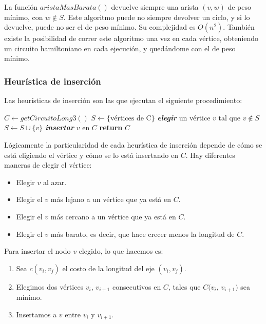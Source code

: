 La funci\'on $aristaMasBarata()$ devuelve siempre una arista $(v,w)$ de peso m\'inimo, con $w \not\in S$. Este algoritmo puede no siempre devolver un ciclo, y si lo devuelve, puede no ser el de peso m\'inimo. Su complejidad es $O(n^2)$. Tambi\'en existe la posibilidad de correr este algoritmo una vez en cada v\'ertice, obteniendo un circuito hamiltoniano en cada ejecuci\'on, y qued\'andome con el de peso m\'inimo.

\newpage
\subsubsection*{Heur\'istica de inserci\'on}

Las heur\'isticas de inserci\'on son las que ejecutan el siguiente procedimiento:

\begin{algorithm}
\begin{algorithmic}[1]
\State $C \gets getCircuitoLong3()$
\State $S \gets \{ \textrm{v\'ertices de C} \}$
  \State \textbf{\emph{elegir}} un v\'ertice $v$ tal que $v \not\in S$
  \State $S \gets S \cup \{ v \}$
  \State \textbf{\emph{insertar}} $v$ en $C$
\EndWhile
\State \textbf{return} $C$
\end{algorithmic}
\end{algorithm}

L\'ogicamente la particularidad de cada heur\'istica de inserci\'on depende de c\'omo se est\'a eligiendo el v\'ertice y c\'omo se lo est\'a insertando en $C$. Hay diferentes maneras de elegir el v\'ertice:

\begin{itemize}
\item Elegir $v$ al azar.
\item Elegir el $v$ m\'as lejano a un v\'ertice que ya est\'a en $C$.
\item Elegir el $v$ m\'as cercano a un v\'ertice que ya est\'a en $C$.
\item Elegir el $v$ m\'as barato, es decir, que hace crecer menos la longitud de $C$.
\end{itemize}

Para insertar el nodo $v$ elegido, lo que hacemos es:

\begin{enumerate}
\item Sea $c(v_i,v_j)$ el costo de la longitud del eje $(v_i,v_j)$.
\item Elegimos dos v\'ertices $v_i$, $v_{i+1}$ consecutivos en $C$, tales que $C(v_i$, $v_{i+1})$ sea m\'inimo.
\item Insertamos a $v$ entre $v_i$ y $v_{i+1}$.
\end{enumerate}

